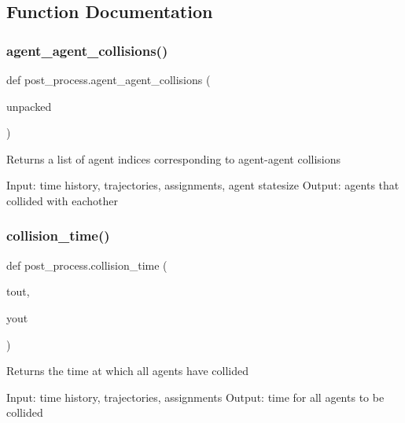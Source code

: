 \subsection{Function Documentation}
\mbox{\label{namespacepost__process_a548242fe2603aa0646c36a3c976978eb}} 
\subsubsection{\texorpdfstring{agent\_agent\_collisions()}{agent\_agent\_collisions()}}
{\footnotesize\ttfamily def post\+\_\+process.\+agent\+\_\+agent\+\_\+collisions (\begin{DoxyParamCaption}\item[{}]{unpacked }\end{DoxyParamCaption})}

\begin{DoxyVerb}Returns a list of agent indices corresponding to agent-agent collisions

Input: time history, trajectories, assignments, agent statesize
Output: agents that collided with eachother\end{DoxyVerb}
 \mbox{\label{namespacepost__process_ad2fef35161f61e0f47770ae31d9c7cc6}} 
\subsubsection{\texorpdfstring{collision\_time()}{collision\_time()}}
{\footnotesize\ttfamily def post\+\_\+process.\+collision\+\_\+time (\begin{DoxyParamCaption}\item[{}]{tout,  }\item[{}]{yout }\end{DoxyParamCaption})}

\begin{DoxyVerb}Returns the time at which all agents have collided

Input: time history, trajectories, assignments
Output: time for all agents to be collided\end{DoxyVerb}
 \mbox{\label{namespacepost__process_aa423e7971223069614adb1e47750a411}} 
